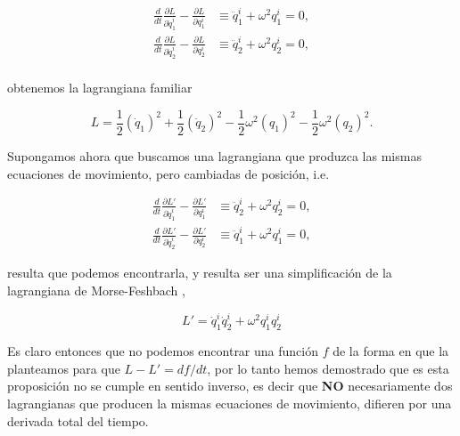 \documentclass[a4paper,10pt]{article}
\numberwithin{equation}{section}
\begin{document}
\begin{align}
 \frac{d}{dt}\frac{\partial L}{\partial \dot{q}^i_1} - \frac{\partial L}{\partial q^i_1} 
 &\equiv  \ddot{q}^i_1 + \omega^2 q^i_1 = 0, \\
 \frac{d}{dt}\frac{\partial L}{\partial \dot{q}^i_2} - \frac{\partial L}{\partial q^i_2} 
 &\equiv  \ddot{q}^i_2 + \omega^2 q^i_2 = 0, \\
\end{align}

obtenemos la lagrangiana familiar

\begin{equation}
 L = \frac{1}{2} (\dot{q}_1)^2 + \frac{1}{2} (\dot{q}_2)^2 - \frac{1}{2} \omega^2 (q_1)^2 
 - \frac{1}{2} \omega^2 (q_2)^2.
\end{equation}

Supongamos ahora que buscamos una lagrangiana que produzca las mismas ecuaciones de 
movimiento, pero cambiadas de posición, i.e.

\begin{align}
 \frac{d}{dt}\frac{\partial L'}{\partial \dot{q}^i_1} - \frac{\partial L'}{\partial q^i_1} 
 &\equiv \ddot{q}^i_2 + \omega^2 q^i_2 = 0, \\
 \frac{d}{dt}\frac{\partial L'}{\partial \dot{q}^i_2} - \frac{\partial L'}{\partial q^i_2} 
 &\equiv  \ddot{q}^i_1 + \omega^2 q^i_1 = 0,
\end{align}

resulta que podemos encontrarla, y resulta ser una simplificación de la lagrangiana 
de Morse-Feshbach \cite{santilli}, 

\begin{equation}
 L' = \dot{q}^i_1\dot{q}^i_2 + \omega^2 q^i_1 q^i_2
\end{equation}

Es claro entonces que no podemos encontrar una función $f$ de la forma en que la planteamos 
para que $L - L' = df/dt$, por lo tanto hemos demostrado que es esta proposición no 
se cumple en sentido inverso, es decir que \textbf{NO} necesariamente dos lagrangianas que 
producen la mismas ecuaciones de movimiento, difieren por una derivada total del tiempo. 
\end{document}
